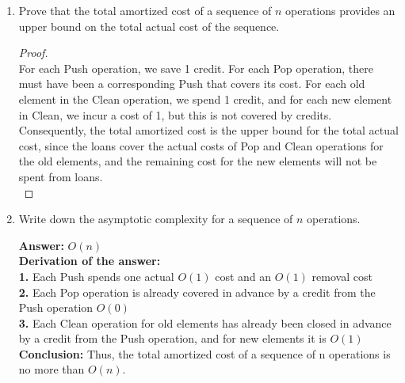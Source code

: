 \documentclass[dvipsnames]{article}
\begin{document}
\begin{enumerate}
{\begin{enumerate}
    \item Prove that the total amortized cost of a sequence of $n$ operations provides an upper bound on the total actual cost of the sequence.

    \color{blue}
    \begin{proof}\\
    For each Push operation, we save 1 credit. For each Pop operation, there must have been a corresponding Push that covers its cost. For each old element in the Clean operation, we spend 1 credit, and for each new element in Clean, we incur a cost of 1, but this is not covered by credits.\\
    Consequently, the total amortized cost is the upper bound for the total actual cost, since the loans cover the actual costs of Pop and Clean operations for the old elements, and the remaining cost for the new elements will not be spent from loans.\\
    \end{proof}
    \color{black}

    \item Write down the asymptotic complexity for a sequence of $n$ operations.

    \color{blue}
    \textbf{Answer:} $O(n)$ \\
    \textbf{Derivation of the answer: }\\
    \hspace*{7mm}
    \textbf{1.} Each Push spends one actual $O(1)$ cost and an $O(1)$ removal cost \\
    \hspace*{6.6mm}
    \textbf{2.} Each Pop operation is already covered in advance by a credit from the Push operation $O(0)$\\
    \hspace*{7mm}
    \textbf{3.} Each Clean operation for old elements has already been closed in advance by a credit from the Push operation, and for new elements it is $O(1)$\\
    \hspace*{7mm}
    \textbf{Conclusion:} Thus, the total amortized cost of a sequence of n operations is no more than $O(n)$.\\
    \color{black}
  \end{enumerate}

}
\end{enumerate}
\end{document}
